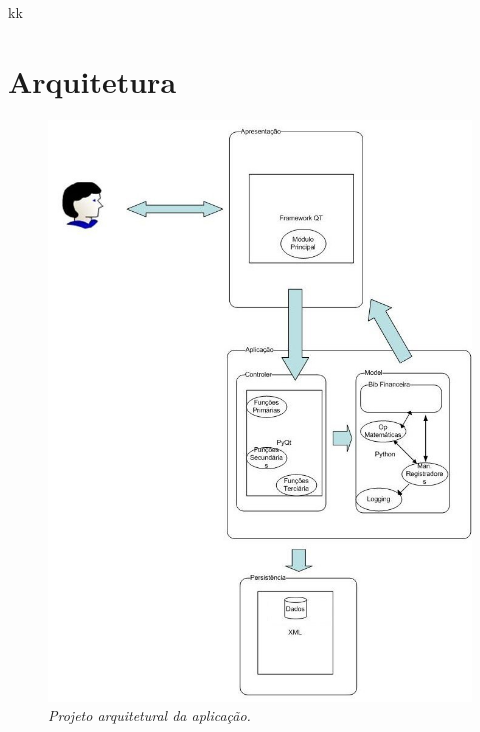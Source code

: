 kk
\chapter{Arquitetura}

\begin{figure}[!h]
 \includegraphics[scale=0.5]{arquitetura.jpg}
 \caption{\it Projeto arquitetural da aplicação.} \label{fig:arquit}
\end{figure}

